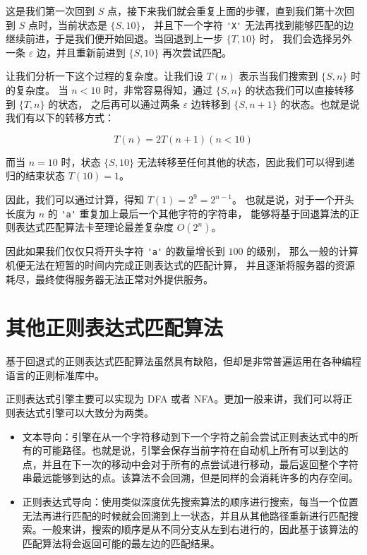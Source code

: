 \documentclass[hyperref,UTF8,12pt,a4paper]{ctexart}
\begin{document}
这是我们第一次回到 $S$ 点，接下来我们就会重复上面的步骤，直到我们第十次回到 $S$ 点时，当前状态是 $\{S, 10\}$，
并且下一个字符 \verb|'X'| 无法再找到能够匹配的边继续前进，于是我们便开始回退。当回退到上一步 $\{T, 10\}$ 时，
我们会选择另外一条 $\varepsilon$ 边，并且重新前进到 $\{S, 10\}$ 再次尝试匹配。

让我们分析一下这个过程的复杂度。让我们设 $T(n)$ 表示当我们搜索到 $\{S, n\}$ 时的复杂度。
当 $n < 10$ 时，非常容易得知，通过 $\{S, n\}$ 的状态我们可以直接转移到 $\{T, n\}$ 的状态，
之后再可以通过两条 $\varepsilon$ 边转移到 $\{S, n+1\}$ 的状态。也就是说我们有以下的转移方式：

\[
	T(n) = 2 T(n+1) (n < 10)
\]

而当 $n = 10$ 时，状态 $\{S, 10\}$ 无法转移至任何其他的状态，因此我们可以得到递归的结束状态 $T(10) = 1$。

因此，我们可以通过计算，得知 $T(1) = 2^9 = 2^{n-1}$。
也就是说，对于一个开头长度为 $n$ 的 \verb|'a'| 重复加上最后一个其他字符的字符串，
能够将基于回退算法的正则表达式匹配算法卡至理论最差复杂度 $O(2^n)$。

因此如果我们仅仅只将开头字符 \verb|'a'| 的数量增长到 $100$ 的级别，
那么一般的计算机便无法在短暂的时间内完成正则表达式的匹配计算，
并且逐渐将服务器的资源耗尽，最终使得服务器无法正常对外提供服务。

\section{其他正则表达式匹配算法}

基于回退式的正则表达式匹配算法虽然具有缺陷，但却是非常普遍运用在各种编程语言的正则标准库中。

正则表达式引擎主要可以实现为 DFA 或者 NFA。更加一般来讲，我们可以将正则表达式引擎可以大致分为两类。

\begin{itemize}
	\item 文本导向：引擎在从一个字符移动到下一个字符之前会尝试正则表达式中的所有的可能路径。也就是说，引擎会保存当前字符在自动机上所有可以到达的点，并且在下一次的移动中会对于所有的点尝试进行移动，最后返回整个字符串最远能够到达的点。该算法不会回溯，但是同样的会消耗许多的内存空间。
	\item 正则表达式导向：使用类似深度优先搜索算法的顺序进行搜索，每当一个位置无法再进行匹配的时候就会回溯到上一状态，并且从其他路径重新进行匹配搜索。一般来讲，搜索的顺序是从不同分支从左到右进行的，因此基于该算法的匹配算法将会返回可能的最左边的匹配结果。
\end{itemize}
\end{document}
